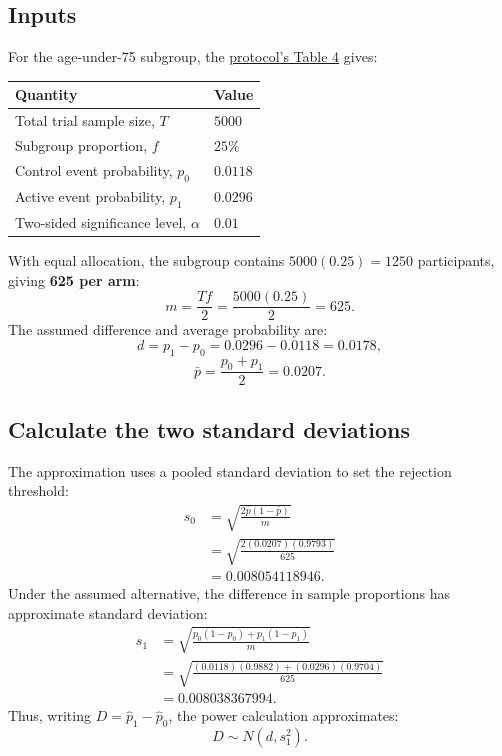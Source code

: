 \documentclass[UTF8,fontset=none,11pt,a4paper]{ctexart}
\newcommand{\recordlink}[2]{\href{#1}{#2}}
\begin{document}
\subsection{Inputs}
For the age-under-75 subgroup, the \recordlink{../joi250068supp1_prod_1760999665.28862.pdf\#page=22}{protocol's Table 4} gives:

\begin{center}
\begin{tabular}{ll}
\toprule
Quantity & Value \\
\midrule
Total trial sample size, $T$ & $5000$ \\
Subgroup proportion, $f$ & $25\%$ \\
Control event probability, $p_0$ & $0.0118$ \\
Active event probability, $p_1$ & $0.0296$ \\
Two-sided significance level, $\alpha$ & $0.01$ \\
\bottomrule
\end{tabular}
\end{center}

With equal allocation, the subgroup contains $5000(0.25)=1250$ participants, giving \textbf{625 per arm}:
\[
m=\frac{Tf}{2}=\frac{5000(0.25)}{2}=625.
\]
The assumed difference and average probability are:
\[
d=p_1-p_0=0.0296-0.0118=0.0178,
\]
\[
\bar p=\frac{p_0+p_1}{2}=0.0207.
\]

\subsection{Calculate the two standard deviations}
The approximation uses a pooled standard deviation to set the rejection threshold:
\[
\begin{aligned}
s_0&=\sqrt{\frac{2\bar p(1-\bar p)}{m}}\\
&=\sqrt{\frac{2(0.0207)(0.9793)}{625}}\\
&=\boxed{0.008054118946}.
\end{aligned}
\]
Under the assumed alternative, the difference in sample proportions has approximate standard deviation:
\[
\begin{aligned}
s_1
&=\sqrt{\frac{p_0(1-p_0)+p_1(1-p_1)}{m}}\\
&=\sqrt{\frac{(0.0118)(0.9882)+(0.0296)(0.9704)}{625}}\\
&=\boxed{0.008038367994}.
\end{aligned}
\]
Thus, writing $D=\widehat p_1-\widehat p_0$, the power calculation approximates:
\[
D\sim N(d,s_1^2).
\]
\end{document}
